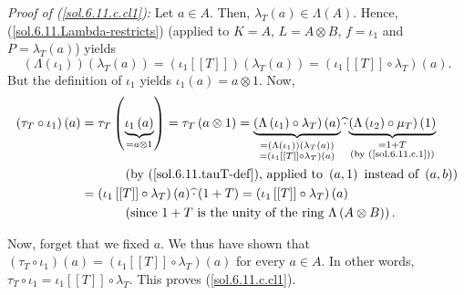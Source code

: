 \documentclass[numbers=enddot,12pt,final,onecolumn,notitlepage]{scrartcl}%
\begin{document}
\textit{Proof of (\ref{sol.6.11.c.cl1}):} Let $a\in A$. Then, $\lambda
_{T}\left(  a\right)  \in\Lambda\left(  A\right)  $. Hence,
(\ref{sol.6.11.Lambda-restricts}) (applied to $K=A$, $L=A\otimes B$,
$f=\iota_{1}$ and $P=\lambda_{T}\left(  a\right)  $) yields
\[
\left(  \Lambda\left(  \iota_{1}\right)  \right)  \left(  \lambda_{T}\left(
a\right)  \right)  =\left(  \iota_{1}\left[  \left[  T\right]  \right]
\right)  \left(  \lambda_{T}\left(  a\right)  \right)  =\left(  \iota
_{1}\left[  \left[  T\right]  \right]  \circ\lambda_{T}\right)  \left(
a\right)  .
\]
But the definition of $\iota_{1}$ yields $\iota_{1}\left(  a\right)
=a\otimes1$. Now,
\begin{align*}
\left(  \tau_{T}\circ\iota_{1}\right)  \left(  a\right)   &  =\tau_{T}\left(
\underbrace{\iota_{1}\left(  a\right)  }_{=a\otimes1}\right)  =\tau_{T}\left(
a\otimes1\right)  =\underbrace{\left(  \Lambda\left(  \iota_{1}\right)
\circ\lambda_{T}\right)  \left(  a\right)  }_{\substack{=\left(
\Lambda\left(  \iota_{1}\right)  \right)  \left(  \lambda_{T}\left(  a\right)
\right)  \\=\left(  \iota_{1}\left[  \left[  T\right]  \right]  \circ
\lambda_{T}\right)  \left(  a\right)  }}\widehat{\cdot}\underbrace{\left(
\Lambda\left(  \iota_{2}\right)  \circ\mu_{T}\right)  \left(  1\right)
}_{\substack{=1+T\\\text{(by (\ref{sol.6.11.c.1}))}}}\\
&  \ \ \ \ \ \ \ \ \ \ \left(  \text{by (\ref{sol.6.11.tauT-def}), applied to
}\left(  a,1\right)  \text{ instead of }\left(  a,b\right)  \right) \\
&  =\left(  \iota_{1}\left[  \left[  T\right]  \right]  \circ\lambda
_{T}\right)  \left(  a\right)  \widehat{\cdot}\left(  1+T\right)  =\left(
\iota_{1}\left[  \left[  T\right]  \right]  \circ\lambda_{T}\right)  \left(
a\right) \\
&  \ \ \ \ \ \ \ \ \ \ \left(  \text{since }1+T\text{ is the unity of the ring
}\Lambda\left(  A\otimes B\right)  \right)  .
\end{align*}


Now, forget that we fixed $a$. We thus have shown that $\left(  \tau_{T}%
\circ\iota_{1}\right)  \left(  a\right)  =\left(  \iota_{1}\left[  \left[
T\right]  \right]  \circ\lambda_{T}\right)  \left(  a\right)  $ for every
$a\in A$. In other words, $\tau_{T}\circ\iota_{1}=\iota_{1}\left[  \left[
T\right]  \right]  \circ\lambda_{T}$. This proves (\ref{sol.6.11.c.cl1}).
\end{document}

